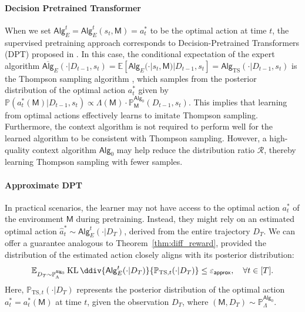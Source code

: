 \documentclass[10pt]{article}
\newcommand{\eps}{\varepsilon}
\newcommand{\KL}{\operatorname{KL}\ddiv}
\newcommand{\<}{\left\langle}
\renewcommand{\>}{\right\rangle}
\newcommand{\E}{\mathbb{E}}
\renewcommand{\P}{\mathbb{P}}
\newcommand{\inst}{{\mathsf{M}}}
\newcommand{\TS}{{\mathrm{TS}}}
\newcommand{\state}{{s}}
\newcommand{\action}{{a}}
\newcommand{\totlen}{{T}}
\newcommand{\sAlg}{{\mathsf{Alg}}}
\newcommand{\osAlg}{\overline{\mathsf{Alg}}}
\newcommand{\dset}{{D}}
\newcommand{\appeps}{\eps_{{\mathsf{approx}}}}
\newcommand{\prior}{{\Lambda}}
\newcommand{\shortexp}{{E}}
\newcommand{\distratio}{{\mathcal{R}}}
\begin{document}
\paragraph{Decision Pretrained Transformer} When we set $\sAlg_\shortexp^t = \sAlg_\shortexp^t(\state_t,\inst)=\action^*_t$ to be the optimal action at time $t$, the supervised pretraining approach corresponds to Decision-Pretrained Transformers (DPT) proposed in \cite{lee2023supervised}. In this case, the conditional expectation of the expert algorithm $\osAlg_\shortexp(\cdot|\dset_{t-1},\state_t)=\E[\sAlg_{\shortexp}(\cdot|\state_t,\inst)|\dset_{t-1},\state_t]=\sAlg_{\TS}(\cdot|\dset_{t-1},\state_t)$ is the Thompson sampling algorithm \citep[Theorem 1]{lee2023supervised}, which samples from the posterior distribution of the optimal action $\action^*_t$ given by $\P(a^*_t(\inst) |\dset_{t-1},\state_t)\propto \prior(\inst)\cdot\P_\inst^{\sAlg_0}(\dset_{t-1},\state_t)$. This implies that learning from optimal actions effectively learns to imitate Thompson sampling. Furthermore, the context algorithm is not required to perform well for the learned algorithm to be consistent with Thompson sampling. However, a high-quality context algorithm $\sAlg_0$ may help reduce the distribution ratio $\distratio$, thereby learning Thompson sampling with fewer samples.






\paragraph{Approximate DPT} In practical scenarios, the learner may not have access to the optimal action $\action^*_t$ of the environment $\inst$ during pretraining. Instead, they might rely on an estimated optimal action $\widehat\action_t^* \sim \sAlg_{\shortexp}^t(\cdot | \dset_\totlen)$, derived from the entire trajectory $\dset_\totlen$. We can offer a guarantee analogous to Theorem~\ref{thm:diff_reward}, provided the distribution of the estimated action closely aligns with its posterior distribution:
\begin{align}\E_{\dset_\totlen\sim\P_{\prior}^{\sAlg_0}}\KL{\sAlg_{\shortexp}^t(\cdot | \dset_\totlen)}{\P_{\TS,t}(\cdot|\dset_\totlen)}\leq\appeps,~~~ \forall t \in [\totlen].
\label{eq:app_opt_cond}
\end{align}
Here, $\P_{\TS,t}(\cdot|\dset_\totlen)$ represents the posterior distribution of the optimal action $\action^*_t=\action^*_t(\inst)$ at time $t$, given the observation $\dset_\totlen$, where $(\inst, \dset_\totlen) \sim \P_\prior^{\sAlg_0}$.
\end{document}
